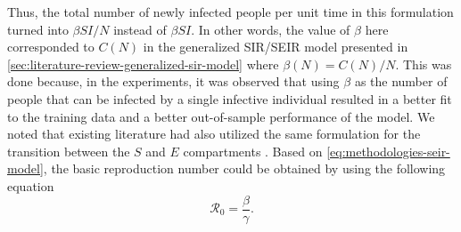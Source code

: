 Thus, the total number of newly infected people per unit time in this formulation turned into $\beta SI / N$ instead of $\beta SI$.
In other words, the value of $\beta$ here corresponded to $C(N)$ in the generalized \gls{SIR}/\gls{SEIR} model presented in \autoref{sec:literature-review-generalized-sir-model} where $\beta(N) = C(N) / N$.
This was done because, in the experiments, it was observed that using $\beta$ as the number of people that can be infected by a single infective individual resulted in a better fit to the training data and a better out-of-sample performance of the model.
We noted that existing literature had also utilized the same formulation for the transition between the $S$ and $E$ compartments \cite{arikInterpretableSequenceLearning, bastosModelingForecastingEarly2020,dengDynamicsDevelopmentCOVID192020, heSEIRModelingCOVID192020,ihmecovid-19forecastingteamModelingCOVID19Scenarios2021, ndairouMathematicalModelingCOVID192020,sarkarModelingForecastingCOVID192020, zhaoModelingEpidemicDynamics2020}.
Based on \autoref{eq:methodologies-seir-model}, the basic reproduction number could be obtained by using the following equation \cite{brauerCompartmentalModelsEpidemiology2008}
\begin{equation}
    \mathcal{R}_0 = \frac{\beta}{\gamma}.
    \label{eq:methodologies-seir-reproduction-number}
\end{equation}

